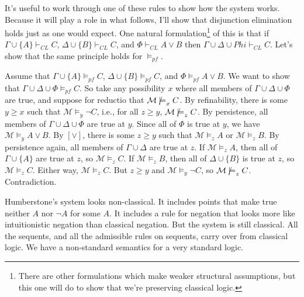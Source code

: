 \documentclass[
  11pt,
  letterpaper,
  DIV=11,
  numbers=noendperiod,
  twoside]{scrartcl}
\newcommand{\nmodels}{\mathrel{\ooalign{$\models$\cr\raisebox{-0.001ex}{\hss$\mkern-1mu/\hss$}}}}
\begin{document}
It's useful to work through one of these rules to show how the system
works. Because it will play a role in what follows, I'll show that
disjunction elimination holds just as one would expect. One natural
formulation\footnote{There are other formulations which make weaker
  structural assumptions, but this one will do to show that we're
  preserving classical logic.} of this is that if
\(\Gamma \cup \{A\} \vdash_{CL} C\),
\(\Delta \cup \{B\} \vdash_{CL} C\), and \(\Phi \vdash_{CL} A \vee B\)
then \(\Gamma \cup \Delta \cup Phi \vdash_{CL} C\). Let's show that the
same principle holds for \(\vDash_{pf}\).

Assume that \(\Gamma \cup \{A\} \vDash_{pf} C\),
\(\Delta \cup \{B\} \vDash_{pf} C\), and \(\Phi \vDash_{pf} A \vee B\).
We want to show that \(\Gamma \cup \Delta \cup \Phi \vDash_{pf} C\). So
take any possibility \(x\) where all members of
\(\Gamma \cup \Delta \cup \Phi\) are true, and suppose for reductio that
\(\mathcal{M} \nmodels_x C\). By refinability, there is some
\(y \geqslant x\) such that \(\mathcal{M} \models_y \neg C\), i.e., for
all \(z \geqslant y\), \(\mathcal{M} \nmodels_z C\). By persistence, all
members of \(\Gamma \cup \Delta \cup \Phi\) are true at \(y\). Since all
of \(\Phi\) is true at \(y\), we have
\(\mathcal{M} \models_y A \vee B\). By \([\vee]\), there is some
\(z \geqslant y\) such that \(\mathcal{M} \models_z A\) or
\(\mathcal{M} \models_z B\). By persistence again, all members of
\(\Gamma \cup \Delta\) are true at \(z\). If
\(\mathcal{M} \models_z A\), then all of \(\Gamma \cup \{A\}\) are true
at \(z\), so \(\mathcal{M} \models_z C\). If
\(\mathcal{M} \models_z B\), then all of \(\Delta \cup \{B\}\) is true
at \(z\), so \(\mathcal{M} \models_z C\). Either way,
\(\mathcal{M} \models_z C\). But \(z \geqslant y\) and
\(\mathcal{M} \models_y \neg C\), so \(\mathcal{M} \nmodels_z C\).
Contradiction.

Humberstone's system looks non-classical. It includes points that make
true neither \(A\) nor \(\neg A\) for some \(A\). It includes a rule for
negation that looks more like intuitionistic negation than classical
negation. But the system is still classical. All the sequents, and all
the admissible rules on sequents, carry over from classical logic. We
have a non-standard semantics for a very standard logic.
\end{document}
